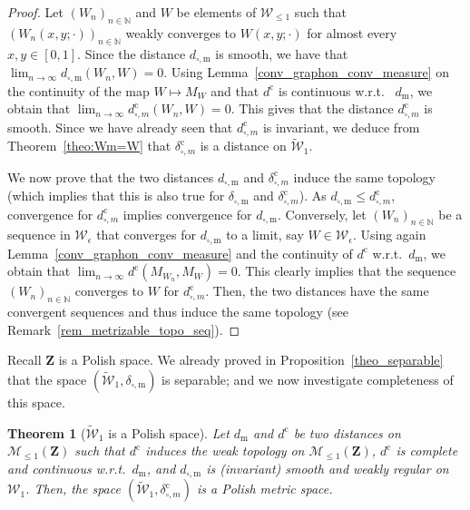 \documentclass{amsart}
\newcommand{\wrt}{w.r.t.\ }
\theoremstyle{plain}
\newtheorem{theo}[Th]{Theorem}
\theoremstyle{definition}
\newcommand{\Space}{\mathbf{Z}}
\newcommand{\SubProba}{\mathcal{M}_{\leq1}(\Space)}
\newcommand{\Graphon}{\mathcal{W}_1}
\newcommand{\SubGraphon}{\mathcal{W}_{\leq 1}}
\newcommand{\KernelEps}{\mathcal{W}_{\epsilon}}
\newcommand{\UGraphon}{\widetilde{\mathcal{W}}_1}
\newcommand{\m}{\mathrm{m}}
\newcommand{\dmeas}{d_\m}
\newcommand{\dcut}{d_{\square,\m}}
\newcommand{\ddcut}{\delta_{\square,\m}}
\newcommand{\ccc}{\mathrm{c}}
\newcommand{\dmeasC}{d^\ccc}
\newcommand{\dcutC}{d^\ccc_{\square, m}}
\newcommand{\ddcutC}{\delta^\ccc_{\square, m}}
\newcommand{\N}{\mathbb{N}}
\begin{document}
\begin{proof}
  Let $(W_n  )_{n\in\N}$ and  $W$ be elements  of $\SubGraphon$  such that
  $(W_n(x,y;\cdot)  )_{n\in\N}$  weakly converges  to $W(x,y;\cdot)$  for
  almost every $x,y\in[0,1]$.  Since the  distance $\dcut$ is smooth, we
  have that $\lim_{n\rightarrow \infty } \dcut(W_n,W)= 0$.  
  Using
  Lemma~\ref{conv_graphon_conv_measure}  on the  continuity  of the  map
  $W \mapsto  M_W$ and  that $\dmeasC$  is   continuous \wrt
  $\dmeas$,                we                 obtain                that
  $\lim_{n\rightarrow \infty  } \dcutC(W_n,W)=  0$. This gives  that the
  distance  $\dcutC$  is  smooth.  Since  we  have  already  seen  that $\dcutC$  is
  invariant, we deduce from  Theorem~\ref{theo:Wm=W} that $\ddcutC$ is a
  distance on $\UGraphon$.

  \medskip

  We now  prove that  the two  distances $\dcut$ and $\ddcutC$ induce  the same  topology
  (which implies that this is also true for $\ddcut$ and $\ddcutC$).
  As  $\dcut \leq  \dcutC$, convergence for $\dcutC$  implies convergence
  for $\dcut$.   Conversely, let $(W_n )_{n\in\N}$ be a  sequence in $\KernelEps$  
  that converges for  $\dcut$ to a  limit, say $W\in\KernelEps$.   
  Using   again  Lemma~\ref{conv_graphon_conv_measure}   and  the
     continuity     of     $\dmeasC$ \wrt $\dmeas$,    we     obtain     that
  $\lim_{n\rightarrow \infty} \dmeasC(M_{W_n},M_W)= 0$. 
  This  clearly implies
  that the sequence $(W_n )_{n\in\N}$ converges to $W$ for $\dcutC$.
  Then, the two distances have the same convergent sequences
  	and thus induce the same topology (see Remark~\ref{rem_metrizable_topo_seq}).
\end{proof}



Recall $\Space$ is a Polish space.
We already proved in Proposition~\ref{theo_separable}
that the space $(\UGraphon, \ddcut)$ is separable;
and we now investigate completeness of this space.

\begin{theo}[$\UGraphon$ is a Polish space]\label{theo_complete}
  Let $\dmeas$ and  $\dmeasC$ be two distances on  $\SubProba$ such that
  $\dmeasC$  induces  the  weak topology  on $\SubProba$, $\dmeasC$  is
  complete  and  continuous \wrt  $\dmeas$, and  $\dcut$ is
  (invariant) smooth and weakly regular  on $\Graphon$.  Then, the space
  $(\UGraphon,  \ddcutC)$  is  a  Polish metric  space. 
\end{theo}
\end{document}
